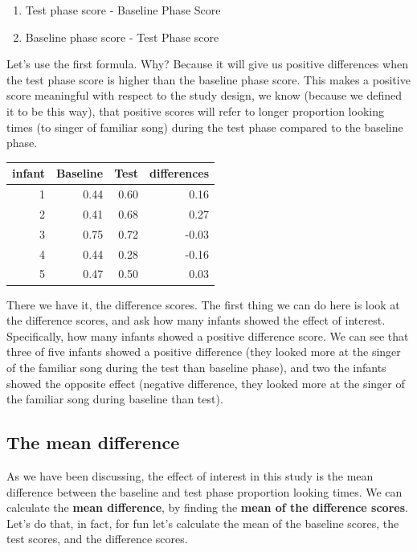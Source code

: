 \documentclass[
]{book}
\providecommand{\tightlist}{%
  \setlength{\itemsep}{0pt}\setlength{\parskip}{0pt}}
\begin{document}
\begin{enumerate}
\def\labelenumi{\arabic{enumi}.}
\tightlist
\item
  Test phase score - Baseline Phase Score
\item
  Baseline phase score - Test Phase score
\end{enumerate}

Let's use the first formula. Why? Because it will give us positive differences when the test phase score is higher than the baseline phase score. This makes a positive score meaningful with respect to the study design, we know (because we defined it to be this way), that positive scores will refer to longer proportion looking times (to singer of familiar song) during the test phase compared to the baseline phase.

\begin{tabular}{r|r|r|r}
\hline
infant & Baseline & Test & differences\\
\hline
1 & 0.44 & 0.60 & 0.16\\
\hline
2 & 0.41 & 0.68 & 0.27\\
\hline
3 & 0.75 & 0.72 & -0.03\\
\hline
4 & 0.44 & 0.28 & -0.16\\
\hline
5 & 0.47 & 0.50 & 0.03\\
\hline
\end{tabular}

There we have it, the difference scores. The first thing we can do here is look at the difference scores, and ask how many infants showed the effect of interest. Specifically, how many infants showed a positive difference score. We can see that three of five infants showed a positive difference (they looked more at the singer of the familiar song during the test than baseline phase), and two the infants showed the opposite effect (negative difference, they looked more at the singer of the familiar song during baseline than test).

\subsection{The mean difference}\label{the-mean-difference}

As we have been discussing, the effect of interest in this study is the mean difference between the baseline and test phase proportion looking times. We can calculate the \textbf{mean difference}, by finding the \textbf{mean of the difference scores}. Let's do that, in fact, for fun let's calculate the mean of the baseline scores, the test scores, and the difference scores.
\end{document}
